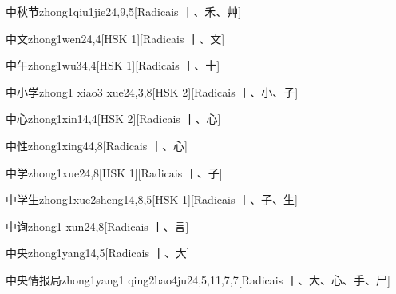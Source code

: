 \begin{entry}{中秋节}{zhong1qiu1jie2}{4,9,5}[Radicais ⼁、⽲、⾋]
\end{entry}

\begin{entry}{中文}{zhong1wen2}{4,4}[HSK 1][Radicais ⼁、⽂]
\end{entry}

\begin{entry}{中午}{zhong1wu3}{4,4}[HSK 1][Radicais ⼁、⼗]
\end{entry}

\begin{entry}{中小学}{zhong1 xiao3 xue2}{4,3,8}[HSK 2][Radicais ⼁、⼩、⼦]
\end{entry}

\begin{entry}{中心}{zhong1xin1}{4,4}[HSK 2][Radicais ⼁、⼼]
\end{entry}

\begin{entry}{中性}{zhong1xing4}{4,8}[Radicais ⼁、⼼]
\end{entry}

\begin{entry}{中学}{zhong1xue2}{4,8}[HSK 1][Radicais ⼁、⼦]
\end{entry}

\begin{entry}{中学生}{zhong1xue2sheng1}{4,8,5}[HSK 1][Radicais ⼁、⼦、⽣]
\end{entry}

\begin{entry}{中询}{zhong1 xun2}{4,8}[Radicais ⼁、⾔]
\end{entry}

\begin{entry}{中央}{zhong1yang1}{4,5}[Radicais ⼁、⼤]
\end{entry}

\begin{entry}{中央情报局}{zhong1yang1 qing2bao4ju2}{4,5,11,7,7}[Radicais ⼁、⼤、⼼、⼿、⼫]
\end{entry}

